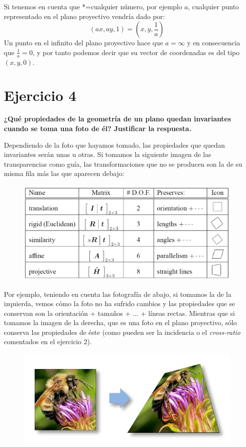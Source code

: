 \documentclass[11pt,a4paper]{article}
\begin{document}
Si tenemos en cuenta que *=cualquier número, por ejemplo $a$, cualquier punto representado en el plano proyectivo vendría dado por:
\begin{equation*}
(ax, ay, 1) = (x,y,\frac{1}{a})
\end{equation*}
Un punto en el infinito del plano proyectivo hace que $a=\infty$ y en consecuencia que $\frac{1}{a} = 0$, y por tanto podemos decir que su vector de
coordenadas es del tipo $(x,y,0)$.



\section*{Ejercicio 4}
\textbf{¿Qué propiedades de la geometría de un plano quedan invariantes cuando se toma una foto de él? Justificar la respuesta.}

Dependiendo de la foto que hayamos tomado, las propiedades que quedan invariantes serán unas u otras. Si tomamos la siguiente imagen de las
transparencias como guía, las transformaciones que no se producen son la de su misma fila más las que aparecen debajo:
\begin{figure}[H]
\centering
\includegraphics[scale=0.4]{img/transformaciones.png}
\end{figure}

Por ejemplo, teniendo en cuenta las fotografía de abajo, si tomamos la de la izquierda, vemos cómo la foto no ha sufrido cambios y las propiedades
que se conservan son la orientación + tamaños + ... + líneas rectas. Mientras que si tomamos la imagen de la derecha, que es una foto en el plano
proyectivo, sólo conserva las propiedades de éste (como pueden ser la incidencia o el \textit{cross-ratio} comentados en el ejercicio 2).
\begin{figure}[H]
\centering
\includegraphics[scale=0.6]{img/transformaciones2.png}
\end{figure}
\end{document}

